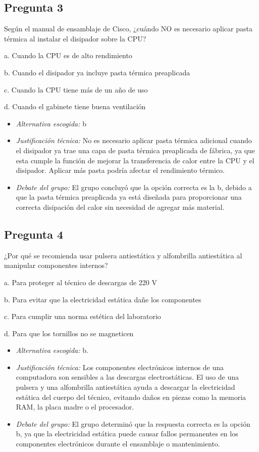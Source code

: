 \documentclass{article}
\begin{document}
\subsection{Pregunta 3}
\label{sec:org8ed2055}
Según el manual de ensamblaje de Cisco, ¿cuándo NO es necesario aplicar pasta térmica al instalar el disipador sobre la CPU?

a. Cuando la CPU es de alto rendimiento

b. Cuando el disipador ya incluye pasta térmica preaplicada

c. Cuando la CPU tiene más de un año de uso

d. Cuando el gabinete tiene buena ventilación

\begin{itemize}
\item \emph{Alternativa escogida:} b
\item \emph{Justificación técnica:} No es necesario aplicar pasta térmica
adicional cuando el disipador ya trae una capa de pasta térmica
preaplicada de fábrica, ya que esta cumple la función de mejorar
la transferencia de calor entre la CPU y el disipador. Aplicar más
pasta podría afectar el rendimiento térmico.
\item \emph{Debate del grupo:} El grupo concluyó que la opción correcta es la
b, debido a que la pasta térmica preaplicada ya está diseñada para
proporcionar una correcta disipación del calor sin necesidad de agregar más material.
\end{itemize}

\subsection{Pregunta 4}
\label{sec:org7568353}
¿Por qué se recomienda usar pulsera antiestática y alfombrilla antiestática al manipular componentes internos?

a. Para proteger al técnico de descargas de 220 V

b. Para evitar que la electricidad estática dañe los componentes

c. Para cumplir una norma estética del laboratorio

d. Para que los tornillos no se magneticen

\begin{itemize}
\item \emph{Alternativa escogida:} b.
\item \emph{Justificación técnica:} Los componentes electrónicos internos de
una computadora son sensibles a las descargas electrostáticas.
El uso de una pulsera y una alfombrilla antiestática ayuda a
descargar la electricidad estática del cuerpo del técnico, evitando
daños en piezas como la memoria RAM, la placa madre o el procesador.
\item \emph{Debate del grupo:} El grupo determinó que la respuesta correcta es
la opción b, ya que la electricidad estática puede causar fallos
permanentes en los componentes electrónicos durante el ensamblaje o
mantenimiento.
\end{itemize}
\end{document}
